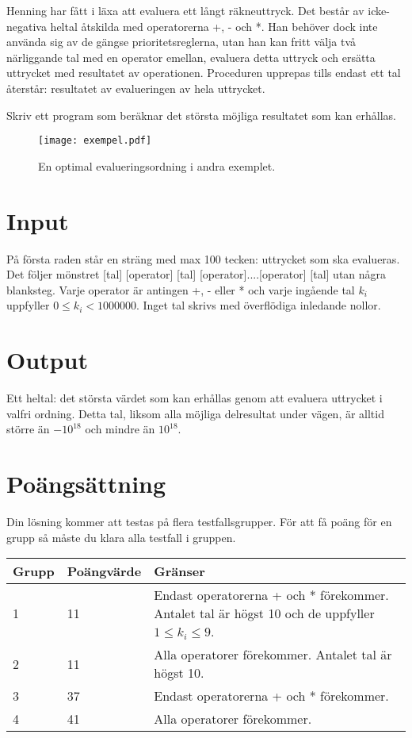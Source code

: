 
Henning har fått i läxa att evaluera ett långt räkneuttryck. Det består av icke-negativa heltal åtskilda med operatorerna +, - och *. Han behöver dock inte använda sig av de gängse prioritetsreglerna, utan han kan fritt välja två närliggande tal med en operator emellan, evaluera detta uttryck och ersätta uttrycket med resultatet av operationen. Proceduren upprepas tills endast ett tal återstår: resultatet av evalueringen av hela uttrycket.

Skriv ett program som beräknar det största möjliga resultatet som kan erhållas.

\begin{figure}[ht!]
\centering
\texttt{[image: exempel.pdf]}
\caption{En optimal evalueringsordning i andra exemplet.}
\label{overflow}
\end{figure}

\section*{Input}

På första raden står en sträng med max 100 tecken: uttrycket som ska evalueras. Det följer mönstret [tal] [operator] [tal] [operator]....[operator] [tal] utan några blanksteg. Varje operator är antingen +, - eller * och varje ingående tal $k_i$ uppfyller $0\leq k_i < 1000000$. Inget tal skrivs med överflödiga inledande nollor.

\section*{Output}

Ett heltal: det största värdet som kan erhållas genom att evaluera uttrycket i valfri ordning. Detta tal, liksom alla möjliga delresultat under vägen, är alltid större än $-10^{18}$ och mindre än $10^{18}$.


\section*{Poängsättning}
Din lösning kommer att testas på flera testfallsgrupper. För att få poäng för en grupp
så måste du klara alla testfall i gruppen.

\begin{tabular}{| l | l | l |}
\hline
Grupp & Poängvärde & Gränser \\ \hline
1     & 11         & Endast operatorerna + och * förekommer. Antalet tal är högst 10 och de uppfyller $1\leq k_i \leq 9$. \\
2     & 11         & Alla operatorer förekommer. Antalet tal är högst 10. \\
3     & 37         & Endast operatorerna + och * förekommer.\\ 
4     & 41         & Alla operatorer förekommer. \hline
\end{tabular}


